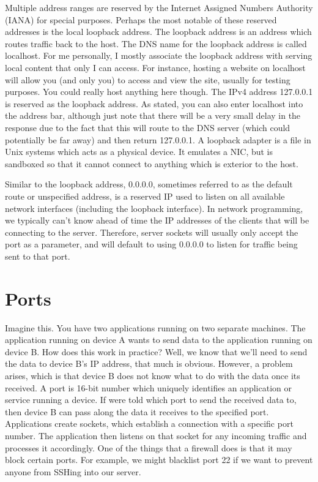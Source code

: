 \documentclass{article}
\begin{document}
Multiple address ranges are reserved by the Internet Assigned Numbers Authority (IANA) for special purposes.
Perhaps the most notable of these reserved addresses is the local loopback address. The loopback address is an
address which routes traffic back to the host. The DNS name for the loopback address is called localhost. For
me personally, I mostly associate the loopback address with serving local content that only I can access. For
instance, hosting a website on localhost will allow you (and only you) to access and view the site, usually
for testing purposes. You could really host anything here though. The IPv4 address 127.0.0.1 is reserved as
the loopback address. As stated, you can also enter localhost into the address bar, although just note that
there will be a very small delay in the response due to the fact that this will route to the DNS server (which
could potentially be far away) and then return 127.0.0.1. A loopback adapter is a file in Unix systems which
acts as a physical device. It emulates a NIC, but is sandboxed so that it cannot connect to anything which
is exterior to the host.

Similar to the loopback address, 0.0.0.0, sometimes referred to as the default route or unspecified address, is
a reserved IP used to listen on all available network interfaces (including the loopback interface). In
network programming, we typically can't know ahead of time the IP addresses of the clients that will be
connecting to the server. Therefore, server sockets will usually only accept the port as a parameter, and will
default to using 0.0.0.0 to listen for traffic being sent to that port.

\section{Ports}

Imagine this. You have two applications running on two separate machines. The application running on device A
wants to send data to the application running on device B. How does this work in practice? Well, we know that
we'll need to send the data to device B's IP address, that much is obvious. However, a problem arises, which is
that device B does not know what to do with the data once its received. A port is 16-bit number which uniquely
identifies an application or service running a device. If were told which port to send the received data to,
then device B can pass along the data it receives to the specified port. Applications create sockets, which
establish a connection with a specific port number. The application then listens on that socket for any
incoming traffic and processes it accordingly. One of the things that a firewall does is that it may block
certain ports. For example, we might blacklist port 22 if we want to prevent anyone from SSHing into our
server.
\end{document}
